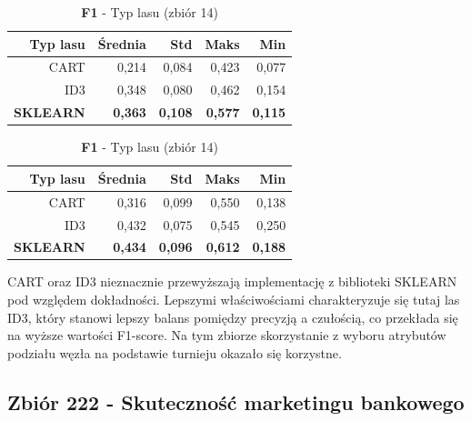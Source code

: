 \documentclass[a4paper]{article}
\begin{document}
\begin{table}[htbp]
        \begin{minipage}[t]{0.48\textwidth}
            \centering
            \caption{\textbf{Czułość} - Typ lasu (zbiór 14)}
            \label{tab:Compare_on_14_rec}
            \begin{tabular}{r|r|r|r|r}
                \toprule
                Typ lasu & Średnia & Std & Maks & Min \\
                \hline
                CART & 0,214 & 0,084 & 0,423 & 0,077 \\
                ID3 & 0,348 & 0,080 & 0,462 & 0,154 \\
                \textbf{SKLEARN} & \textbf{0,363} & \textbf{0,108} & \textbf{0,577} & \textbf{0,115} \\
                \bottomrule
            \end{tabular}
        \end{minipage}
        \hfill
        \begin{minipage}[t]{0.48\textwidth}
            \centering
            \caption{\textbf{F1} - Typ lasu (zbiór 14)}
            \label{tab:Compare_on_14_f1}
            \begin{tabular}{r|r|r|r|r}
                \toprule
                Typ lasu & Średnia & Std & Maks & Min \\
                \hline
                CART & 0,316 & 0,099 & 0,550 & 0,138 \\
                ID3 & 0,432 & 0,075 & 0,545 & 0,250 \\
                \textbf{SKLEARN} & \textbf{0,434} & \textbf{0,096} & \textbf{0,612} & \textbf{0,188} \\
                \bottomrule
            \end{tabular}
        \end{minipage}
    \end{table}

    CART oraz ID3 nieznacznie przewyższają implementację z biblioteki SKLEARN pod względem dokładności. Lepszymi właściwościami charakteryzuje się
    tutaj las ID3, który stanowi lepszy balans pomiędzy precyzją a czułością, co przekłada się na wyższe wartości F1-score.
    Na tym zbiorze skorzystanie z wyboru atrybutów podziału węzła na podstawie turnieju okazało się korzystne.

\subsection{Zbiór 222 - Skuteczność marketingu bankowego}
\end{document}
